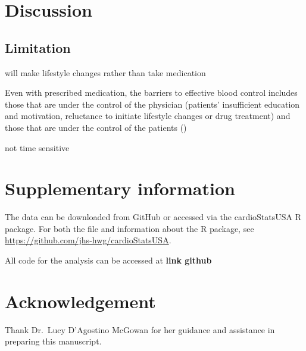 \documentclass[useAMS,usenatbib,referee]{biom}
\begin{document}
\hypertarget{discussion}{%
\section{Discussion}\label{discussion}}

\hypertarget{limitation}{%
\subsection{Limitation}\label{limitation}}

will make lifestyle changes rather than take medication

Even with prescribed medication, the barriers to effective blood control
includes those that are under the control of the physician (patients'
insufficient education and motivation, reluctance to initiate lifestyle
changes or drug treatment) and those that are under the control of the
patients () \citep{dusing_overcoming_2006}

not time sensitive

\hypertarget{supplement}{%
\section{Supplementary information}\label{supplement}}

The data can be downloaded from GitHub or accessed via the
cardioStatsUSA R package. For both the file and information about the R
package, see \url{https://github.com/jhs-hwg/cardioStatsUSA}.

All code for the analysis can be accessed at \textbf{link github}

\hypertarget{acknowledge}{%
\section{Acknowledgement}\label{acknowledge}}

Thank Dr.~Lucy D'Agostino McGowan for her guidance and assistance in
preparing this manuscript.






\label{lastpage}
\end{document}
